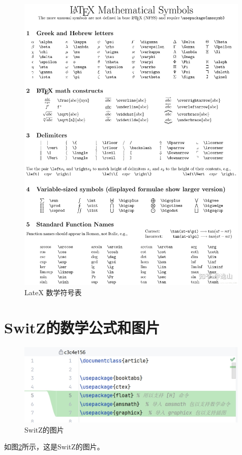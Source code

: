 \documentclass{article}
\begin{document}
\begin{figure}[H]
    \centering
    \includegraphics[width=0.99\textwidth]{img/latex-math-example.jpg}
    \caption{LateX 数学符号表}
    \label{fig:latex-math-symbols}
\end{figure}



\section{SwitZ的数学公式和图片}
\begin{figure}[H]
    \centering
    \includegraphics[width=0.99\textwidth]{img/switz_screenshot_250313_1711.png}
    \caption{SwitZ的图片}
    \label{fig:SwitZ-fig}
\end{figure}
如图\ref{fig:SwitZ-fig}所示，这是SwitZ的图片。\\
\end{document}
